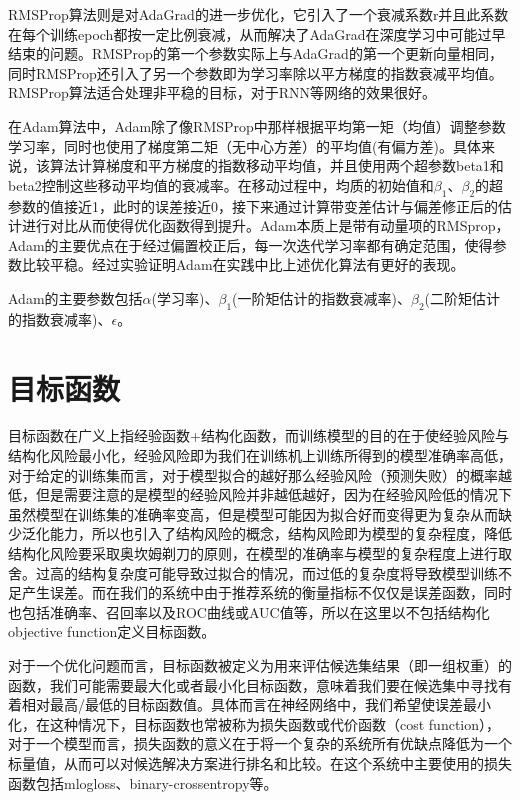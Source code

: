 RMSProp算法则是对AdaGrad的进一步优化，它引入了一个衰减系数r并且此系数在每个训练epoch都按一定比例衰减，从而解决了AdaGrad在深度学习中可能过早结束的问题。RMSProp的第一个参数实际上与AdaGrad的第一个更新向量相同，同时RMSProp还引入了另一个参数即为学习率除以平方梯度的指数衰减平均值。RMSProp算法适合处理非平稳的目标，对于RNN等网络的效果很好。

在Adam算法中，Adam除了像RMSProp中那样根据平均第一矩（均值）调整参数学习率，同时也使用了梯度第二矩（无中心方差）的平均值(有偏方差)。具体来说，该算法计算梯度和平方梯度的指数移动平均值，并且使用两个超参数beta1和beta2控制这些移动平均值的衰减率。在移动过程中，均质的初始值和${\beta}_{1}$、${\beta}_{2}$的超参数的值接近1，此时的误差接近0，接下来通过计算带变差估计与偏差修正后的估计进行对比从而使得优化函数得到提升。Adam本质上是带有动量项的RMSprop，Adam的主要优点在于经过偏置校正后，每一次迭代学习率都有确定范围，使得参数比较平稳。经过实验证明Adam在实践中比上述优化算法有更好的表现。

Adam的主要参数包括${\alpha}$(学习率)、${\beta}_{1}$(一阶矩估计的指数衰减率)、${\beta}_{2}$(二阶矩估计的指数衰减率)、${\epsilon}$。



\section{目标函数}

目标函数在广义上指经验函数+结构化函数，而训练模型的目的在于使经验风险与结构化风险最小化，经验风险即为我们在训练机上训练所得到的模型准确率高低，对于给定的训练集而言，对于模型拟合的越好那么经验风险（预测失败）的概率越低，但是需要注意的是模型的经验风险并非越低越好，因为在经验风险低的情况下虽然模型在训练集的准确率变高，但是模型可能因为拟合好而变得更为复杂从而缺少泛化能力，所以也引入了结构风险的概念，结构风险即为模型的复杂程度，降低结构化风险要采取奥坎姆剃刀的原则，在模型的准确率与模型的复杂程度上进行取舍。过高的结构复杂度可能导致过拟合的情况，而过低的复杂度将导致模型训练不足产生误差。而在我们的系统中由于推荐系统的衡量指标不仅仅是误差函数，同时也包括准确率、召回率以及ROC曲线或AUC值等，所以在这里以不包括结构化objective function定义目标函数。

对于一个优化问题而言，目标函数被定义为用来评估候选集结果（即一组权重）的函数，我们可能需要最大化或者最小化目标函数，意味着我们要在候选集中寻找有着相对最高/最低的目标函数值。具体而言在神经网络中，我们希望使误差最小化，在这种情况下，目标函数也常被称为损失函数或代价函数（cost function），对于一个模型而言，损失函数的意义在于将一个复杂的系统所有优缺点降低为一个标量值，从而可以对候选解决方案进行排名和比较\cite{NeuralSmithing}。在这个系统中主要使用的损失函数包括mlogloss、binary-crossentropy等。

